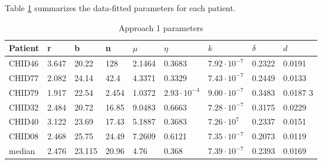 \documentclass[]{elsarticle}
\theoremstyle{definition}
\begin{document}

Table \ref{app1values} summarizes the data-fitted parameters for each patient.


\begin{table}[H]
\footnotesize
\centering
\begin{tabular}{|l|l|l|l|l|l|l|l|l|}
\hline
Patient   & r & b & n   & $\mu$ & $\eta$ & $k$ & $\delta$ &  $d$  \\
\hline
CHID46 &  3.647 & 20.22 & 128  &2.1464 & 0.3683 & $7.92\cdot 10^{-7}$ & 0.2322 &  0.0191  \\\hline
CHID77 & 2.082 & 24.14 & 42.4 & 4.3371 & 0.3329 & $7.43\cdot10^{-7}$ & 0.2449 & 0.0133  \\\hline
CHID79 & 1.917 & 22.54 & 2.454& 1.0372 & $2.93\cdot10^{-4}$ & $9.00\cdot10^{-7}$ & 0.3483 & 0.0187 3 \\\hline
CHID32& 2.484 & 20.72 & 16.85 & 9.0483 & 0.6663 & $7.28\cdot10^{-7}$ & 0.3175 & 0.0229  \\\hline
CHID40 & 3.122 & 23.69 & 17.43& 5.1887 & 0.3683 & $7.26\cdot10^{7}$ & 0.2337& 0.0151  \\\hline
CHID08 & 2.468 & 25.75 & 24.49 & 7.2609 & 0.6121 & $7.35\cdot10^{-7}$ & 0.2073 & 0.0119  \\\hline
median &2.476 & 23.115 & 20.96& 4.76   & 0.368  & $7.39\cdot10^{-7}$ & 0.2393  & 0.0169  \\\hline
\end{tabular}
\caption{Approach 1 parameters}
\label{app1values}
\end{table}
\end{document}
